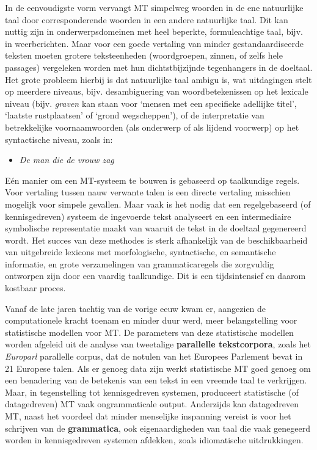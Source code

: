 \begin{multicols}{2}

    In de eenvoudigste vorm vervangt MT simpelweg woorden in de ene natuurlijke taal door corresponderende woorden in een andere natuurlijke taal. Dit kan nuttig zijn in onderwerpsdomeinen met heel beperkte, formuleachtige taal, bijv. in weerberichten. Maar voor een goede vertaling van minder gestandaardiseerde teksten moeten grotere teksteenheden (woordgroepen, zinnen, of zelfs hele passages) vergeleken worden met hun dichtstbijzijnde tegenhangers in de doeltaal. Het grote probleem hierbij is dat natuurlijke taal ambigu is, wat uitdagingen stelt op meerdere niveaus, bijv. desambiguering van woordbetekenissen op het lexicale niveau (bijv. \emph{graven} kan staan voor `mensen met een specifieke adellijke titel', `laatste rustplaatsen' of `grond wegscheppen'), of de interpretatie van betrekkelijke voornaamwoorden (als onderwerp of als lijdend voorwerp) op het syntactische niveau, zoals in:\\

   \begin{itemize}
     \item    \emph{De man die de vrouw zag}
   \end{itemize}


    E{\'e}n manier om een MT-systeem te bouwen is gebaseerd op taalkundige regels. Voor vertaling tussen nauw verwante talen is een directe vertaling misschien mogelijk voor simpele gevallen. Maar vaak is het nodig dat een regelgebaseerd (of kennisgedreven) systeem de ingevoerde tekst analyseert en een intermediaire symbolische representatie maakt van waaruit de tekst in de doeltaal gegenereerd wordt. Het succes van deze methodes is sterk afhankelijk van de beschikbaarheid van uitgebreide lexicons met morfologische, syntactische, en semantische informatie, en grote verzamelingen van grammaticaregels die zorgvuldig ontworpen zijn door een vaardig taalkundige. Dit is een tijdsintensief en daarom kostbaar proces.


    Vanaf de late jaren tachtig van de vorige eeuw kwam er, aangezien de computationele kracht toenam en minder duur werd, meer belangstelling voor statistische modellen voor MT. De parameters van deze statistische modellen worden afgeleid uit de analyse van tweetalige \textbf{parallelle tekstcorpora}, zoals het \emph{Europarl} parallelle corpus, dat de notulen van het Europees Parlement bevat in 21 Europese talen. Als er genoeg data zijn werkt statistische MT goed genoeg om een benadering van de betekenis van een tekst in een vreemde taal te verkrijgen. Maar, in tegenstelling tot kennisgedreven systemen, produceert statistische (of datagedreven) MT vaak ongrammaticale output. Anderzijds kan datagedreven MT, naast het voordeel dat minder menselijke inspanning vereist is voor het schrijven van de \textbf{grammatica}, ook eigenaardigheden van  taal die vaak genegeerd worden in kennisgedreven systemen afdekken, zoals idiomatische uitdrukkingen.


\end{multicols}
